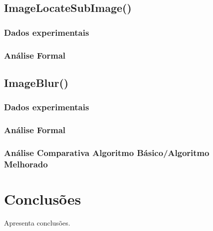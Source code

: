 \documentclass{report}
\begin{document}
\section{ImageLocateSubImage()}

\subsection{Dados experimentais}

\subsection{Análise Formal}


\section{ImageBlur()}

\subsection{Dados experimentais}

\subsection{Análise Formal}

\subsection{Análise Comparativa Algoritmo Básico/Algoritmo Melhorado}



\chapter{Conclusões}
\label{chap.conclusao}
Apresenta conclusões.
\end{document}
